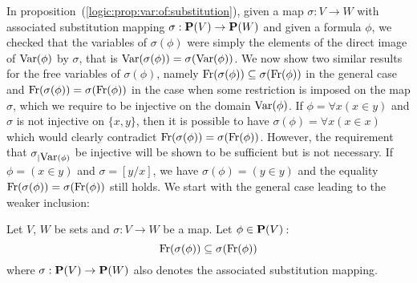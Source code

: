 In proposition~(\ref{logic:prop:var:of:substitution}), given a map
$\sigma:V\to W$ with associated substitution mapping
$\sigma:\mbox{${\bf P}(V)$}\to{\bf P}(W)$ and given a formula $\phi$, we checked
that the variables of $\sigma(\phi)$ were simply the elements of the
direct image of $\mbox{\rm Var}(\phi)$ by $\sigma$, that is
$\mbox{\rm Var}(\sigma(\phi))=\sigma(\mbox{\rm Var}(\phi))$. We now show two similar
results for the free variables of $\sigma(\phi)$, namely
$\mbox{\rm Fr}(\sigma(\phi))\subseteq\sigma(\mbox{\rm Fr}(\phi))$ in the general
case and $\mbox{\rm Fr}(\sigma(\phi))=\sigma(\mbox{\rm Fr}(\phi))$ in the case when
some restriction is imposed on the map $\sigma$, which we require to
be injective on the domain $\mbox{\rm Var}(\phi)$. If $\phi=\forall x(x\in y)$
and $\sigma$ is not injective on $\{x,y\}$, then it is possible to
have $\sigma(\phi)=\forall x(x\in x)$ which would clearly contradict
$\mbox{\rm Fr}(\sigma(\phi))=\sigma(\mbox{\rm Fr}(\phi))$. However, the requirement
that $\sigma_{|\mbox{\rm Var}(\phi)}$ be injective will be shown to be
sufficient but is not necessary. If $\phi=(x\in y)$ and
$\sigma=[y/x]$, we have $\sigma(\phi)=(y\in y)$ and the equality
$\mbox{\rm Fr}(\sigma(\phi))=\sigma(\mbox{\rm Fr}(\phi))$ still holds. We start with
the general case leading to the weaker inclusion:
\begin{prop}\label{logic:prop:freevar:of:substitution:inclusion}
    Let $V$, $W$ be sets and $\sigma:V\to W$ be a map. Let
    $\phi\in\mbox{${\bf P}(V)$}$\,:
    \[
        \mbox{\rm Fr}(\sigma(\phi))\subseteq\sigma(\mbox{\rm Fr}(\phi))
    \]
    where $\sigma:\mbox{${\bf P}(V)$}\to{\bf P}(W)$ also denotes the associated substitution 
    mapping.
\end{prop}
